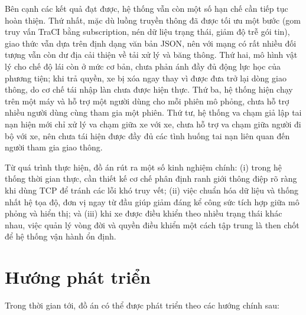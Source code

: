 \documentclass[../DoAn.tex]{subfiles}
\begin{document}
Bên cạnh các kết quả đạt được, hệ thống vẫn còn một số hạn chế cần tiếp tục hoàn
thiện. Thứ nhất, mặc dù luồng truyền thông đã được tối ưu một bước (gom truy vấn
\gls{TraCI} bằng subscription, nén dữ liệu trạng thái, giảm độ trễ gói tin), giao
thức vẫn dựa trên định dạng văn bản \gls{JSON}, nên với mạng có rất nhiều đối
tượng vẫn còn dư địa cải thiện về tải xử lý và băng thông. Thứ hai, mô hình vật lý cho chế độ lái còn ở mức cơ bản, chưa phản ánh đầy
đủ động lực học của phương tiện; khi trả quyền, xe bị xóa ngay thay vì được
đưa trở lại dòng giao thông, do cơ chế tái nhập làn chưa được hiện thực. Thứ
ba, hệ thống hiện chạy trên một máy và hỗ trợ một người dùng cho mỗi phiên mô
phỏng, chưa hỗ trợ nhiều người dùng cùng tham gia một phiên. Thứ tư, hệ thống va
chạm giả lập tai nạn hiện mới chỉ xử lý va chạm giữa xe với xe, chưa hỗ trợ va
chạm giữa người đi bộ với xe, nên chưa tái hiện được đầy đủ các tình huống tai
nạn liên quan đến người tham gia giao thông.

Từ quá trình thực hiện, đồ án rút ra một số kinh nghiệm chính: (i) trong hệ thống
thời gian thực, cần thiết kế cơ chế phân định ranh giới thông điệp rõ ràng khi
dùng TCP để tránh các lỗi khó truy vết; (ii) việc chuẩn hóa dữ liệu và thống nhất
hệ tọa độ, đơn vị ngay từ đầu giúp giảm đáng kể công sức tích hợp giữa mô phỏng
và hiển thị; và (iii) khi xe được điều khiển theo nhiều trạng thái khác nhau,
việc quản lý vòng đời và quyền điều khiển một cách tập trung là then chốt để hệ
thống vận hành ổn định.

\section{Hướng phát triển}

Trong thời gian tới, đồ án có thể được phát triển theo các hướng chính sau:
\end{document}
